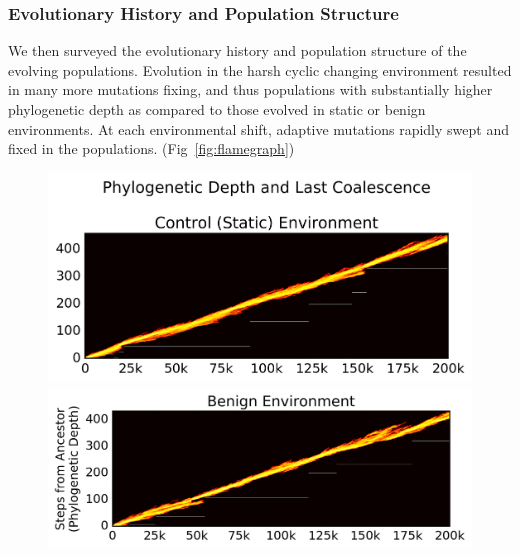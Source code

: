 \documentclass[10pt,letterpaper]{article}
\begin{document}
\subsubsection*{Evolutionary History and Population Structure}
We then surveyed the evolutionary history and population structure of the evolving populations. Evolution in the harsh cyclic changing environment resulted in many more mutations fixing, and thus populations with substantially higher phylogenetic depth as compared to those evolved in static or benign environments. At each environmental shift, adaptive mutations rapidly swept and fixed in the populations. (Fig~\ref{fig:flamegraph})

	\begin{figure}[!h]
	\includegraphics[trim={-0.88cm 0 0.25cm 0},clip,width=0.65\columnwidth]{figures/CE/control__phylodepth_with_coalescense.png}

	\includegraphics[trim={0.2cm 0 0.25cm 0},clip,width=0.65\columnwidth]{figures/CE/benign__phylodepth_with_coalescense.png}
	

\end{figure}
\end{document}
